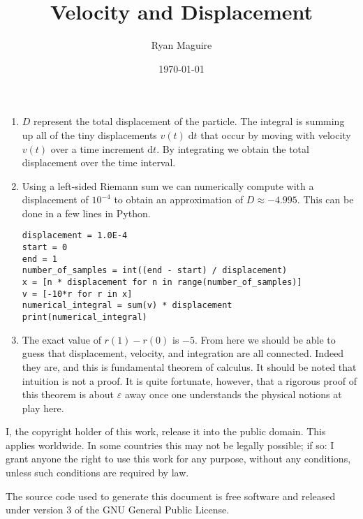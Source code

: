 \documentclass{article}
\title{Velocity and Displacement}
\author{Ryan Maguire}
\date{\today}
\begin{document}
    \maketitle
    \begin{enumerate}
        \item
            $D$ represent the total displacement of the particle.
            The integral is summing up all of the tiny displacements
            $v(t)\;\textrm{d}t$ that occur by moving with velocity
            $v(t)$ over a time increment $\textrm{d}t$. By integrating we
            obtain the total displacement over the time interval.
        \item
            Using a left-sided Riemann sum we can numerically compute
            with a displacement of $10^{-4}$ to obtain an approximation of
            $D\approx-4.995$. This can be done in a few lines in Python.
            \begin{verbatim}
displacement = 1.0E-4
start = 0
end = 1
number_of_samples = int((end - start) / displacement)
x = [n * displacement for n in range(number_of_samples)]
v = [-10*r for r in x]
numerical_integral = sum(v) * displacement
print(numerical_integral)
            \end{verbatim}
        \item
            The exact value of $r(1)-r(0)$ is $-5$.
            From here we should be able to guess that displacement, velocity,
            and integration are all connected. Indeed they are, and this is
            fundamental theorem of calculus. It should be noted that intuition
            is not a proof. It is quite fortunate, however, that a rigorous
            proof of this theorem is about $\varepsilon$ away once one
            understands the physical notions at play here.
    \end{enumerate}
    \newpage
    I, the copyright holder of this work, release it into the public domain.
    This applies worldwide. In some countries this may not be legally possible;
    if so: I grant anyone the right to use this work for any purpose, without
    any conditions, unless such conditions are required by law.
    \par\hfill\par
    The source code used to generate this document is free software and released
    under version 3 of the GNU General Public License.
\end{document}
